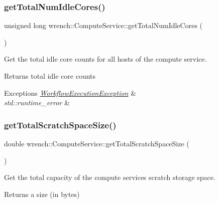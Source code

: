 \subsubsection{\texorpdfstring{get\+Total\+Num\+Idle\+Cores()}{getTotalNumIdleCores()}}
{\footnotesize\ttfamily unsigned long wrench\+::\+Compute\+Service\+::get\+Total\+Num\+Idle\+Cores (\begin{DoxyParamCaption}{ }\end{DoxyParamCaption})}



Get the total idle core counts for all hosts of the compute service. 

\begin{DoxyReturn}{Returns}
total idle core counts
\end{DoxyReturn}

\begin{DoxyExceptions}{Exceptions}
{\em \hyperlink{classwrench_1_1_workflow_execution_exception}{Workflow\+Execution\+Exception}} & \\
\hline
{\em std\+::runtime\+\_\+error} & \\
\hline
\end{DoxyExceptions}
\mbox{\label{classwrench_1_1_compute_service_ae0a8acd4a82063250799e313f1d520d1}} 
\subsubsection{\texorpdfstring{get\+Total\+Scratch\+Space\+Size()}{getTotalScratchSpaceSize()}}
{\footnotesize\ttfamily double wrench\+::\+Compute\+Service\+::get\+Total\+Scratch\+Space\+Size (\begin{DoxyParamCaption}{ }\end{DoxyParamCaption})}



Get the total capacity of the compute service\textquotesingle{}s scratch storage space. 

\begin{DoxyReturn}{Returns}
a size (in bytes) 
\end{DoxyReturn}
\mbox{\label{classwrench_1_1_compute_service_a244e08a35ea94061acc1396f9447bb0c}} 
